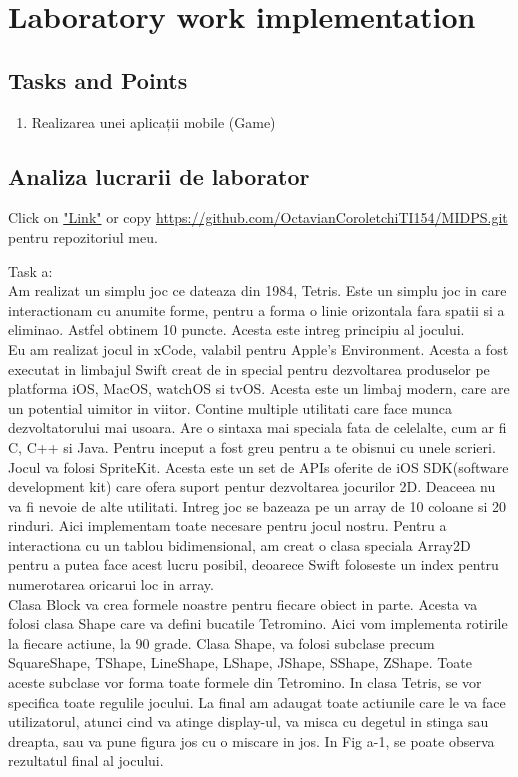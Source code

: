 \section{Laboratory work implementation}

\subsection{Tasks and Points}
\begin{enumerate}
	\item  Realizarea unei  aplicații mobile (Game)
	
\end{enumerate}

\subsection{Analiza lucrarii de laborator}

Click on \href{https://github.com/OctavianCoroletchiTI154/MIDPS.git}{"Link"} or copy \url{https://github.com/OctavianCoroletchiTI154/MIDPS.git} pentru repozitoriul meu.
\par Task a: \\
Am realizat un simplu joc ce dateaza din 1984, Tetris. Este un simplu joc in care interactionam cu anumite forme, pentru a forma o linie orizontala fara spatii si a eliminao. Astfel obtinem 10 puncte. Acesta este intreg principiu al jocului. \\
Eu am realizat jocul in xCode, valabil pentru Apple's Environment. Acesta a fost executat in limbajul Swift creat de in special pentru dezvoltarea produselor pe platforma iOS, MacOS, watchOS si tvOS. Acesta este un limbaj modern, care are un potential uimitor in viitor. Contine multiple utilitati care face munca dezvoltatorului mai usoara. Are o sintaxa mai speciala fata de celelalte, cum ar fi C, C++ si Java. Pentru inceput a fost greu pentru a te obisnui cu unele scrieri.\\
Jocul va folosi SpriteKit. Acesta este un set de APIs oferite de iOS SDK(software development kit) care ofera suport pentur dezvoltarea jocurilor 2D. Deaceea nu va fi nevoie de alte utilitati. 
Intreg joc se bazeaza pe un array de 10 coloane si 20 rinduri. Aici implementam toate necesare pentru jocul nostru. Pentru a interactiona cu un tablou bidimensional, am creat o clasa speciala Array2D pentru a putea face acest lucru posibil, deoarece Swift foloseste un index pentru numerotarea oricarui loc in array. \\
Clasa Block va crea formele noastre pentru fiecare obiect in parte.  Acesta va folosi clasa Shape care va defini bucatile Tetromino. Aici vom implementa rotirile la fiecare actiune, la 90 grade. Clasa Shape, va folosi subclase precum SquareShape, TShape, LineShape, LShape, JShape, SShape, ZShape. Toate aceste subclase vor forma toate formele din Tetromino. In clasa Tetris, se vor specifica toate regulile jocului. La final am adaugat toate actiunile care le va face utilizatorul, atunci cind va atinge display-ul, va misca cu degetul in stinga sau dreapta, sau va pune figura jos cu o  miscare in jos. 
In Fig a-1, se poate observa rezultatul final al jocului.
\clearpage


